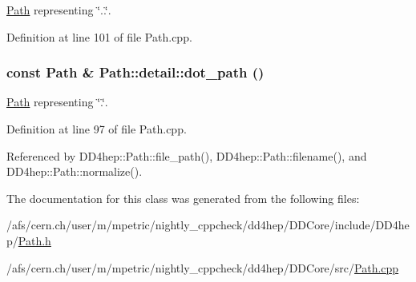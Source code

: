 \hyperlink{class_d_d4hep_1_1_path}{Path} representing \char`\"{}..\char`\"{}. 

Definition at line 101 of file Path.cpp.\hypertarget{class_d_d4hep_1_1_path_1_1detail_ab5518d01c92d39c37cb48ad8ffeb5aa5}{
\subsubsection[{dot\_\-path}]{\setlength{\rightskip}{0pt plus 5cm}const {\bf Path} \& Path::detail::dot\_\-path ()}}
\label{class_d_d4hep_1_1_path_1_1detail_ab5518d01c92d39c37cb48ad8ffeb5aa5}


\hyperlink{class_d_d4hep_1_1_path}{Path} representing \char`\"{}.\char`\"{}. 

Definition at line 97 of file Path.cpp.

Referenced by DD4hep::Path::file\_\-path(), DD4hep::Path::filename(), and DD4hep::Path::normalize().

The documentation for this class was generated from the following files:\begin{DoxyCompactItemize}
\item 
/afs/cern.ch/user/m/mpetric/nightly\_\-cppcheck/dd4hep/DDCore/include/DD4hep/\hyperlink{_path_8h}{Path.h}\item 
/afs/cern.ch/user/m/mpetric/nightly\_\-cppcheck/dd4hep/DDCore/src/\hyperlink{_path_8cpp}{Path.cpp}\end{DoxyCompactItemize}
